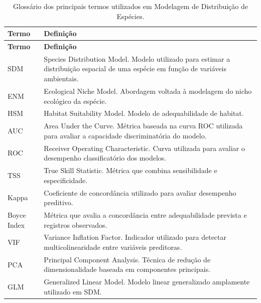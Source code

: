 \documentclass{ueap-sdm}
\begin{document}
\begin{longtable}{
		p{}
		p{}
	}
	
	\caption{Glossário dos principais termos utilizados em Modelagem de Distribuição de Espécies.}
	\label{tab:glossario_sdm}
	\\
	
	\toprule
	\textbf{Termo} &
	\textbf{Definição}
	\\
	\midrule
	\endfirsthead
	
	\toprule
	\textbf{Termo} &
	\textbf{Definição}
	\\
	\midrule
	\endhead
	
	SDM &
	Species Distribution Model. Modelo utilizado para estimar a distribuição espacial de uma espécie em função de variáveis ambientais.
	\\
	
	ENM &
	Ecological Niche Model. Abordagem voltada à modelagem do nicho ecológico da espécie.
	\\
	
	HSM &
	Habitat Suitability Model. Modelo de adequabilidade de habitat.
	\\
	
	AUC &
	Area Under the Curve. Métrica baseada na curva ROC utilizada para avaliar a capacidade discriminatória do modelo.
	\\
	
	ROC &
	Receiver Operating Characteristic. Curva utilizada para avaliar o desempenho classificatório dos modelos.
	\\
	
	TSS &
	True Skill Statistic. Métrica que combina sensibilidade e especificidade.
	\\
	
	Kappa &
	Coeficiente de concordância utilizado para avaliar desempenho preditivo.
	\\
	
	Boyce Index &
	Métrica que avalia a concordância entre adequabilidade prevista e registros observados.
	\\
	
	VIF &
	Variance Inflation Factor. Indicador utilizado para detectar multicolinearidade entre variáveis preditoras.
	\\
	
	PCA &
	Principal Component Analysis. Técnica de redução de dimensionalidade baseada em componentes principais.
	\\
	
	GLM &
	Generalized Linear Model. Modelo linear generalizado amplamente utilizado em SDM.
	\\
	

\end{longtable}
\end{document}
